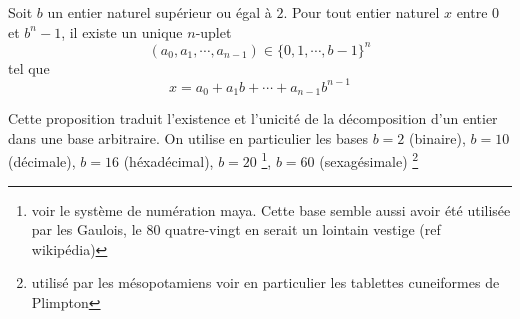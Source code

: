 



\begin{prop}
 Soit $b$ un entier naturel supérieur ou égal à $2$. Pour tout entier naturel $x$ entre $0$ et $b^n-1$, il existe un unique $n$-uplet
\begin{displaymath}
 (a_0,a_1,\cdots,a_{n-1})\in \{0,1,\cdots,b-1\}^n
\end{displaymath}
tel que 
\begin{displaymath}
 x = a_0 + a_1 b +\cdots +a_{n-1}b^{n-1}
\end{displaymath}
\end{prop}
Cette proposition traduit l'existence et l'unicité de la décomposition d'un entier dans une base arbitraire. On utilise en particulier les bases $b=2$ (binaire), $b=10$ (décimale), $b=16$ (héxadécimal), $b=20$ \footnote{voir le système de numération maya. Cette base semble aussi avoir été utilisée par les Gaulois, le 80 quatre-vingt en serait un lointain vestige (ref wikipédia) }, $b=60$ (sexagésimale) \footnote{utilisé par les mésopotamiens voir en particulier les tablettes cuneiformes de Plimpton}
